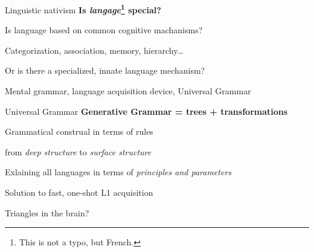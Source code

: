 \documentclass[aspectratio=169,cramped]{beamer}
\let\tempone\itemize
\let\temptwo\enditemize
\renewenvironment{itemize}{\tempone\addtolength{\itemsep}{-0\baselineskip}\addtolength{\parskip}{-0.2\baselineskip}}{\temptwo}
\newcommand{\ex}[1]{{\color{teal} #1}}
\begin{document}
\begin{frame}{Linguistic nativism}
	\textbf{Is \textit{langage}\footnote{This is not a typo, but French.} special?}
	\begin{itemize}
  \item Is language based on common cognitive machanisms?
    \begin{itemize}
    \item \ex{Categorization, association, memory, hierarchy\ldots}
    \end{itemize}
  \item Or is there a specialized, innate language mechanism?
    \begin{itemize}
    \item \ex{Mental grammar, language acquisition device, Universal Grammar}
    \end{itemize}
  \end{itemize}
\end{frame}

\begin{frame}{Universal Grammar}
	\textbf{Generative Grammar = trees + transformations}
	\begin{itemize}
  \item Grammatical construal in terms of rules
    \begin{itemize}
    \item from \emph{deep structure} to \emph{surface structure}
    \end{itemize}
  \item Exlaining all languages in terms of \emph{principles and parameters}
    \begin{itemize}
    \item Solution to fast, one-shot L1 acquisition
    \end{itemize}
  \end{itemize}
\end{frame}

\begin{frame}{Triangles in the brain?}
  \begin{figure}
    \centering
    \vspace{-2cm}
    \hspace{1cm}
  \end{figure}
\end{frame}
\end{document}
